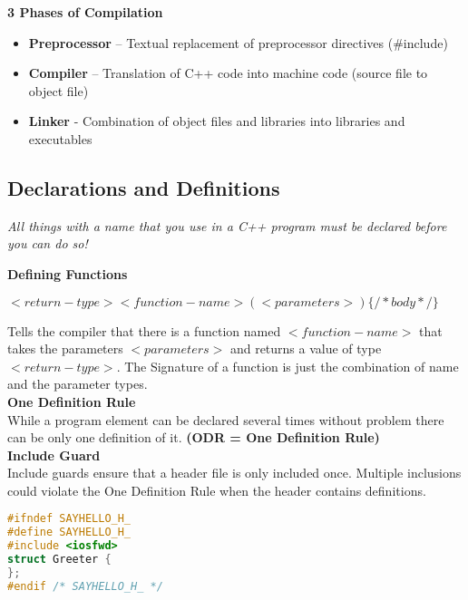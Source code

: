 \textbf{3 Phases of Compilation}
\begin{itemize}
  \itemsep0em 
  \item \textbf{Preprocessor} – Textual replacement of preprocessor directives (\#include)
  \item \textbf{Compiler} – Translation of C++ code into machine code (source file to object file)
  \item \textbf{Linker} - Combination of object files and libraries into libraries and executables
\end{itemize}

\subsection{Declarations and Definitions}
\textit{All things with a name that you use in a C++ program must be declared before you can do so!}

\textbf{Defining Functions}
\begin{center}
$<return-type> <function-name> (<parameters>) \{ /* body */ \}$
\end{center}
 Tells the compiler that there is a function named $<function-name>$ that takes the parameters $<parameters>$ and returns a value of type $<return-type>$. The Signature of a function is just the combination of name and the parameter types. \\
 
\textbf{One Definition Rule}\\ 
 While a program element can be declared several times without problem there can be only one definition of it. \textbf{(ODR = One Definition Rule)} \\
 
 \textbf{Include Guard}\\
Include guards ensure that a header file is only included once. Multiple inclusions could violate the One Definition Rule when the header contains definitions.
\begin{lstlisting}[language=C++]
#ifndef SAYHELLO_H_
#define SAYHELLO_H_
#include <iosfwd>
struct Greeter {
};
#endif /* SAYHELLO_H_ */ 
\end{lstlisting}


